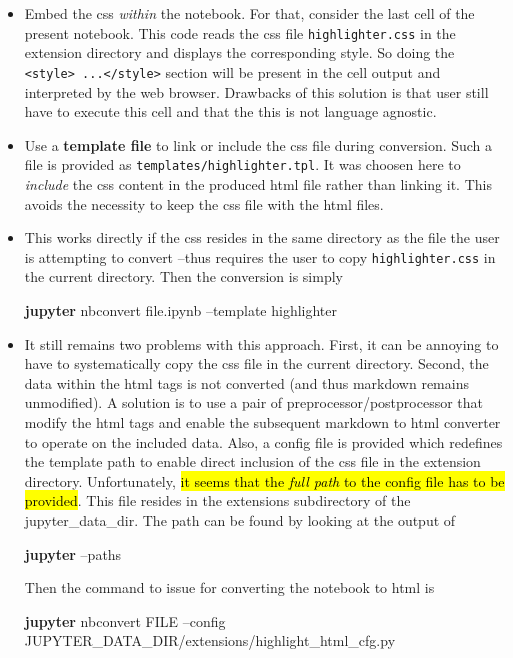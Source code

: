 \documentclass{article}
\newenvironment{Shaded}{}{}
\newcommand{\KeywordTok}[1]{\textcolor[rgb]{0.00,0.44,0.13}{\textbf{{#1}}}}
\newcommand{\NormalTok}[1]{{#1}}
\newcommand{\highlighta}[1]{{\sethlcolor{yellow} \textcolor{red}{\hl{#1}}}}
\begin{document}
\begin{itemize}
\item
  Embed the css \emph{within} the notebook. For that, consider the last
  cell of the present notebook. This code reads the css file
  \texttt{highlighter.css} in the extension directory and displays the
  corresponding style. So doing the
  \texttt{\textless{}style\textgreater{}\ ...\textless{}/style\textgreater{}}
  section will be present in the cell output and interpreted by the web
  browser. Drawbacks of this solution is that user still have to execute
  this cell and that the this is not language agnostic.
\item
  Use a \textbf{template file} to link or include the css file during
  conversion. Such a file is provided as
  \texttt{templates/highlighter.tpl}. It was choosen here to
  \emph{include} the css content in the produced html file rather than
  linking it. This avoids the necessity to keep the css file with the
  html files.
\item
  This works directly if the css resides in the same directory as the
  file the user is attempting to convert --thus requires the user to
  copy \texttt{highlighter.css} in the current directory. Then the
  conversion is simply

\begin{Shaded}
\begin{Highlighting}[]
  \KeywordTok{jupyter} \NormalTok{nbconvert file.ipynb --template highlighter}
\end{Highlighting}
\end{Shaded}
\item
  It still remains two problems with this approach. First, it can be
  annoying to have to systematically copy the css file in the current
  directory. Second, the data within the html tags is not converted (and
  thus markdown remains unmodified). A solution is to use a pair of
  preprocessor/postprocessor that modify the html tags and enable the
  subsequent markdown to html converter to operate on the included data.
  Also, a config file is provided which redefines the template path to
  enable direct inclusion of the css file in the extension directory.
  Unfortunately, \highlighta{it seems that the \emph{full path} to
  the config file has to be provided}. This file resides in the
  extensions subdirectory of the jupyter\_data\_dir. The path can be
  found by looking at the output of

\begin{Shaded}
\begin{Highlighting}[]
 \KeywordTok{jupyter} \NormalTok{--paths}
\end{Highlighting}
\end{Shaded}

  Then the command to issue for converting the notebook to html is

\begin{Shaded}
\begin{Highlighting}[]
 \KeywordTok{jupyter} \NormalTok{nbconvert FILE  --config JUPYTER_DATA_DIR/extensions/highlight_html_cfg.py }
\end{Highlighting}
\end{Shaded}
\end{itemize}
\end{document}
